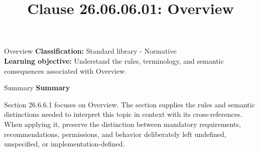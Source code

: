 \documentclass[10pt,letterpaper]{article}
\title{Clause 26.06.06.01: Overview}
\author{}
\date{}
\begin{document}
\maketitle
\begin{CornellOverviewBox}{Overview}
\textbf{Classification:} Standard library - Normative\\[2pt]
\textbf{Learning objective:} Understand the rules, terminology, and semantic consequences associated with Overview.
\end{CornellOverviewBox}\begin{CornellSummaryBox}{Summary}
{\sffamily\bfseries\color{Accent} Summary}\par\vspace{3pt}Section 26.6.6.1 focuses on Overview. The section supplies the rules and semantic distinctions needed to interpret this topic in context with its cross-references. When applying it, preserve the distinction between mandatory requirements, recommendations, permissions, and behavior deliberately left undefined, unspecified, or implementation-defined.
\end{CornellSummaryBox}
\end{document}
